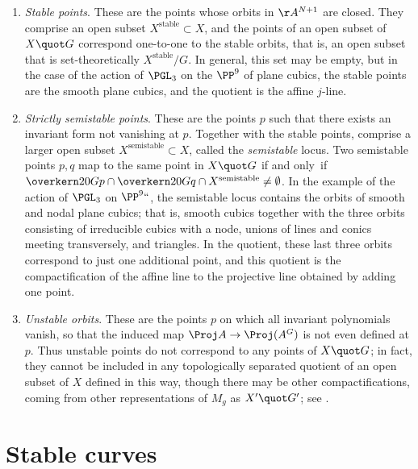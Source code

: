 \begin{enumerate}
\item  \emph{Stable points}. These are the points whose orbits in
%
$\AA^{N+1}$ are closed. They comprise an open subset
$X^{\mathrm{stable}} \subset X$, and the points of an open subset of
$X\quot G$ correspond one-to-one to the stable orbits, that is, an open subset
%
that is
set-theoretically
$X^{\mathrm{stable}}/G$. In general, this
set may be empty, but in the case of the action of
$\PGL_3$
on the
%
$\PP^9$ of
plane cubics,
%
the stable points are the smooth plane
cubics, and the quotient is the affine $j$-line.

%
\item \emph{Strictly semistable points}.
%
%
These are the points $p$ such that there exists an invariant form not
vanishing at $p$.  Together with the stable points, comprise a larger
open subset $X^{\mathrm{{semistable}}} \subset X$, called the
\emph{semistable} locus. Two  semistable points $p,q$ map to the same
point in $X\quot G$ if and only~if $\overkern20{Gp}\cap
\overkern20{Gq}\cap X^{\mathrm{{semistable}}} \neq \emptyset$. In the
example of the action of $\PGL_3$ on  $\PP^9` `$, the semistable
locus contains  the orbits of smooth and nodal plane cubics; that is,
smooth cubics together with the three orbits consisting of irreducible
cubics with a node, unions of lines and conics meeting transversely,
and triangles. In the quotient, these last three orbits correspond to
just one additional point, and this quotient is the
compactification of the affine line
%
to the projective line obtained by adding one point.

\item  \emph{Unstable orbits}. These are the
%
points $p$ on which all invariant polynomials vanish, so that the induced map
$\Proj A \to \Proj (A^G)$ is not even defined at $p$. Thus unstable
points do not correspond to any points of $X\quot G$; in fact, they
cannot be included in any topologically separated quotient of an open
subset of $X$ defined in this way, though there may be other
compactifications, coming from
other representations of $M_g$ as $X'\quot  G'$; see \cite{MR3044128}.
\end{enumerate}

\section{Stable curves}

